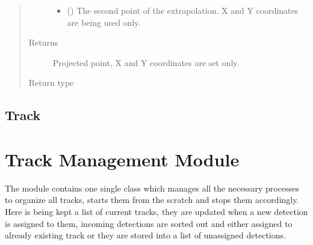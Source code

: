 \documentclass[letterpaper,10pt,english]{Reference manual}
\begin{document}
\begin{fulllineitems}
\begin{fulllineitems}
\begin{quote}
\begin{description}
\begin{itemize}
\item {} 
 ({\hyperref[\detokenize{datacontainers:data_containers.DetectionPoint}]{}}) \textendash{} The second point of the extrapolation. X and Y coordinates are being used only.

\end{itemize}

\item[{Returns}] \leavevmode
Projected point, X and Y coordinates are set only.

\item[{Return type}] \leavevmode
{\hyperref[\detokenize{datacontainers:data_containers.DetectionPoint}]{}}

\end{description}\end{quote}

\end{fulllineitems}


\end{fulllineitems}



\section{Track}
\label{\detokenize{datacontainers:track}}

\begin{fulllineitems}
\label{\detokenize{datacontainers:data_containers.Track}}
\end{fulllineitems}



\chapter{Track Management Module}
\label{\detokenize{trackmanagement:track-management-module}}\label{\detokenize{trackmanagement::doc}}
The module contains one single class which manages all the necessary processes to organize all tracks, starts them from
the scratch and stops them accordingly. Here is being kept a list of current tracks, they are updated when a new detection is
assigned to them, incoming detections are sorted out and either assigned to already existing track or they are stored into
a list of unassigned detections.
\label{\detokenize{trackmanagement:module-track_management}}
\end{document}
